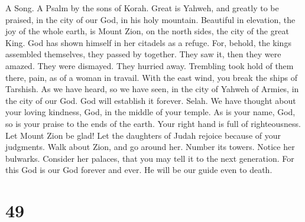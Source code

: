 A Song. A Psalm by the sons of Korah.  Great is Yahweh, and
greatly to be praised, in the city of our God, in his holy mountain.
 Beautiful in elevation, the joy of the whole earth, is
Mount Zion, on the north sides, the city of the great King. 
God has shown himself in her citadels as a refuge.  For,
behold, the kings assembled themselves, they passed by together.
 They saw it, then they were amazed. They were dismayed.
They hurried away.  Trembling took hold of them there, pain,
as of a woman in travail.  With the east wind, you break the
ships of Tarshish.  As we have heard, so we have seen, in
the city of Yahweh of Armies, in the city of our God. God will establish
it forever. Selah.  We have thought about your loving
kindness, God, in the middle of your temple.  As is your
name, God, so is your praise to the ends of the earth. Your right hand
is full of righteousness.  Let Mount Zion be glad! Let the
daughters of Judah rejoice because of your judgments.  Walk
about Zion, and go around her. Number its towers.  Notice
her bulwarks. Consider her palaces, that you may tell it to the next
generation.  For this God is our God forever and ever. He
will be our guide even to death.

\hypertarget{section-47}{%
\section{49}\label{section-47}}

